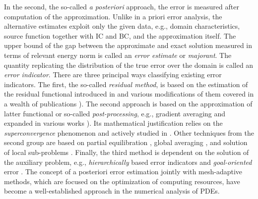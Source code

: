 In the second, the so-called {\em a posteriori} approach, the error is measured after 
computation of the approximation. Unlike in a priori error analysis, the alternative 
estimates exploit only the given data, e.g., domain characteristics, source 
function together with IC and BC, and the approximation itself. The upper bound of 
the gap between the approximate and 
exact solution measured in terms of relevant energy norm is 
called an {\em error estimate} or {\em majorant}. The quantity replicating the 
distribution of the true error over the domain is called an \emph{error indicator}. 
There are three principal ways classifying existing error indicators.  
The first, the so-called {\em residual method}, is based on the estimation of the 
residual 
functional introduced in \cite{BabushkaRheinboldt1978, BabushkaRheinboldtSIAM1978} 
and various modifications of them covered in a wealth of publications 
\cite{ErikssonJohnson1988, JohnsonHansbo1992, 
AinsworthOden1992, AinsworthOden1993, Verfurth1996, DorflerRumpf1998, 
Carstensen1999, CarstensenVerfurth1999,AinsworthOden2000,CarstensenFunken2000,
BabushkaStrouboulis2001, BabushkaWhitemanStrouboulis2011}).
The second approach is based on the approximation of latter functional or so-called 
{\em post-processing}, e.g., gradient averaging 
\cite{ZienkiewiczZhu1987, ZienkiewiczZhu1988} and expanded in various works 
\cite{AinsworthOden1992,BabushkaRodriguez1993,Verfurth1996, Zienkiewiczetall1998,
Wang2000,BabushkaStrouboulis2001,BartelsCarstensen2002, WangYe2002, 
Heimsundetall2002, ZhangNaga2005}). Its mathematical justification relies 
on the {\em superconvergence} phenomenon 
\cite{OganesjanRuhovec1969, Zlamal1977} and actively studied in 
\cite{KrizekNeittaanmaki1984, 
KrizekNeittaanmaki1987,Krizeketall1998, Krizeketall1998,Wahlbin1995}. Other 
techniques from the second group are based on partial 
equilibration \cite{LadevezeLeguillon1983, AinsworthOden2000, Braess2001}, global 
averaging \cite{CarstensenFunken2000, BartelsCarstensen2002,Heimsundetall2002}, and 
solution of local sub-problems \cite{Ainsworth1998, AinsworthOden2000, 
AinsworthRankin2010}.
Finally, the third method is dependent on the solution of the auxiliary problem, e.g., 
{\em hierarchically} based error indicators \cite{Deuflhardetall1989,
Agouzal2001,Duranetall1991,DorflerNochetto2002} and {\em goal-oriented} error 
\cite{BeckerRannacher1996,SteinOhnimus1997,PerairePatera1998,
Houstonetall2000,Rannacher2000,OdenPrudhomme2001,Steinetall2007, Meidneretall2009,
RannacherVexler2010,BesierRannacher2012}. The concept of a posteriori error estimation jointly with mesh-adaptive methods, which are focused on the optimization of 
computing resources, have become a well-established approach in the numerical 
analysis of PDEs. 

